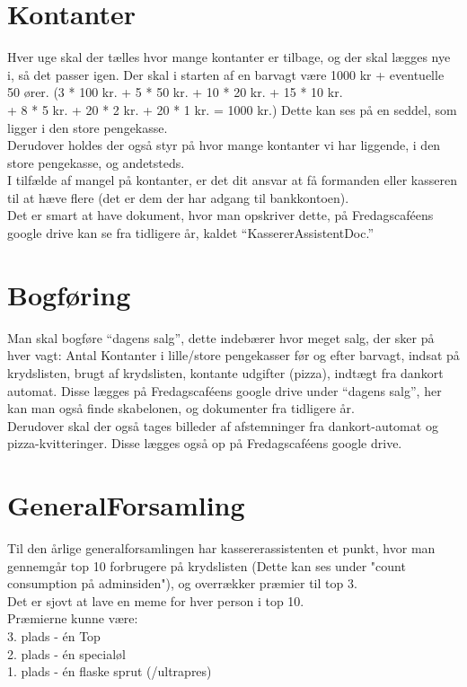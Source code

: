 \section{Kontanter}
Hver uge skal der tælles hvor mange kontanter er tilbage, og der skal lægges
nye i, så det passer igen.
Der skal i starten af en barvagt være 1000 kr + eventuelle 50 ører.
(3 * 100 kr.  + 5 * 50 kr. + 10 * 20 kr. + 15 * 10 kr.
\\+ 8 * 5 kr. + 20 * 2 kr. + 20 * 1 kr. = 1000 kr.)
Dette kan ses på en seddel, som ligger i den store pengekasse.
\\
Derudover holdes der også styr på hvor mange kontanter vi har liggende, i den
store pengekasse, og andetsteds.
\\
I tilfælde af mangel på kontanter, er det dit ansvar at få formanden eller
kasseren til at hæve flere (det er dem der har adgang til bankkontoen).
\\
Det er smart at have dokument, hvor man opskriver dette, på Fredagscaféens
google drive kan se fra tidligere år, kaldet ``KassererAssistentDoc.''

\section{Bogføring}
Man skal bogføre ``dagens salg'', dette indebærer hvor meget salg, der sker på
hver vagt:
Antal Kontanter i lille/store pengekasser før og efter barvagt,
indsat på krydslisten, brugt af krydslisten, kontante
udgifter (pizza), indtægt fra dankort automat.
Disse lægges på Fredagscaféens google drive under ``dagens salg'', her kan man
også finde skabelonen, og dokumenter fra tidligere år.
\\
Derudover skal der også tages billeder af afstemninger fra dankort-automat og
pizza-kvitteringer. Disse lægges også op på Fredagscaféens google drive.

\section{GeneralForsamling}
Til den årlige generalforsamlingen har kassererassistenten et punkt, hvor man gennemgår top 10 forbrugere på krydslisten
(Dette kan ses under "count consumption på adminsiden"), og overrækker præmier til top 3.
\\
Det er sjovt at lave en meme for hver person i top 10.
\\
Præmierne kunne være:
\\
3. plads - én Top
\\
2. plads - én specialøl
\\
1. plads - én flaske sprut (/ultrapres)




